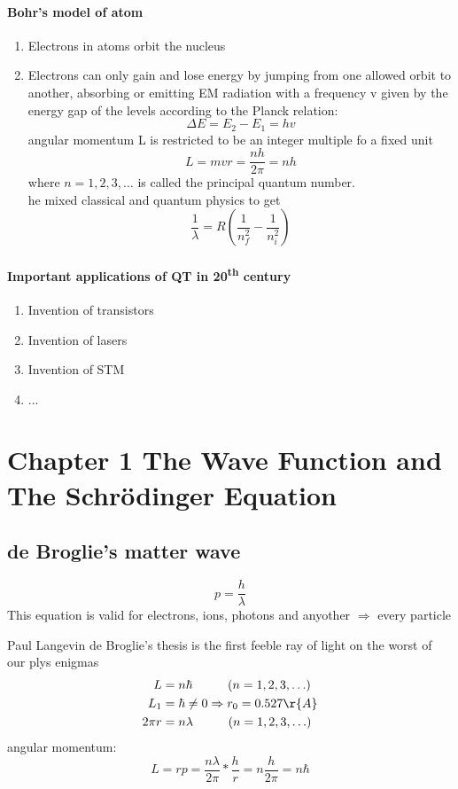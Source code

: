 \documentclass[12pt, a4paper]{article}
\newcommand{\tab}[1][1cm]{\hspace*{#1}}
\begin{document}
\paragraph{Bohr's model of atom}
\begin{enumerate}
\item Electrons in atoms orbit the nucleus
\item Electrons can only gain and lose energy by jumping from one allowed orbit to another, absorbing or emitting EM radiation with a frequency v given by the energy gap of the levels according to the Planck relation: $$\Delta E = E_2-E_1=hv$$
angular momentum L is restricted to be an integer multiple fo a fixed unit $$L=mvr=\frac{nh}{2\pi}=nh$$ where $n=1,2,3, \hdots$ is called the principal quantum number.\\
he mixed classical and quantum physics to get $$\frac{1}{\lambda}=R\left(\frac{1}{n_f^2}-\frac{1}{n_i^2}\right)$$
\end{enumerate}
\paragraph{Important applications of QT in 20\textsuperscript{th} century}
\begin{enumerate}
\item Invention of transistors
\item Invention of lasers
\item Invention of STM
\item ...
\end{enumerate}

\section{Chapter 1 The Wave Function and The Schr\"odinger Equation}
\subsection{de Broglie's matter wave}
\begin{equation}
p=\frac{h}{\lambda}
\end{equation}
This equation is valid for electrons, ions, photons and anyother $\Rightarrow$ every particle

Paul Langevin
de Broglie's thesis is the first feeble ray of light on  the worst of our plys enigmas
\begin{align*}
L&=n\hbar \tab (n=1,2,3,\hdots)\\
L_1 &= \hbar \neq 0 \Rightarrow r_0 = 0.527 \r{A}\\
2\pi r &= n \lambda \tab (n=1,2,3,\hdots)
\end{align*}
angular momentum:
$$L=rp=\frac{n\lambda}{2\pi}*\frac{h}{r}=n\frac{h}{2\pi}=n\hbar$$
\end{document}
